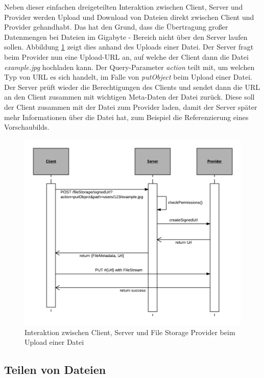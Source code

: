 Neben dieser einfachen dreigeteilten Interaktion zwischen Client, Server und Provider werden Upload und Download von Dateien direkt zwischen Client und Provider gehandhabt. Das hat den Grund, dass die Übertragung großer Datenmengen bei Dateien im Gigabyte - Bereich nicht über den Server laufen sollen. Abbildung \ref{fig:interaction_upload} zeigt dies anhand des Uploads einer Datei. Der Server fragt beim Provider nun eine Upload-URL an, auf welche der Client dann die Datei \textit{example.jpg} hochladen kann. Der Query-Parameter \textit{action} teilt mit, um welchen Typ von URL es sich handelt, im Falle von \textit{putObject} beim Upload einer Datei. Der Server prüft wieder die Berechtigungen des Clients und sendet dann die URL an den Client zusammen mit wichtigen Meta-Daten der Datei zurück. Diese soll der Client zusammen mit der Datei zum Provider laden, damit der Server später mehr Informationen über die Datei hat, zum Beispiel die Referenzierung eines Vorschaubilds.

\begin{figure}[H]
	\centering
	\includegraphics[width=1\linewidth]{images/fileuploadumlsequence}
	\caption[Caption for concept]{Interaktion zwischen Client, Server und File Storage Provider beim Upload einer Datei}
	\label{fig:interaction_upload}
\end{figure}


\subsection{Teilen von Dateien}
\label{sec:sharing_concept}

